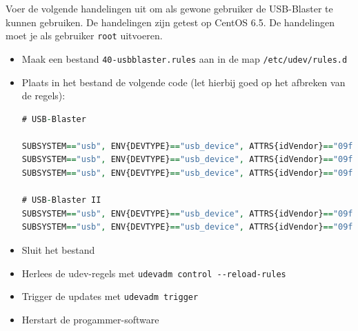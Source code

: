 \documentclass[a4paper,12pt,fleqn,twoside]{book}
\begin{document}
Voer de volgende handelingen uit om als gewone gebruiker de USB-Blaster te
kunnen gebruiken. De handelingen zijn getest op CentOS 6.5. De handelingen
moet je als gebruiker \lstinline|root| uitvoeren.

\begin{itemize}\itemsep-1pt
\item Maak een bestand \lstinline|40-usbblaster.rules| aan in de map
      \lstinline|/etc/udev/rules.d|
\item Plaats in het bestand de volgende code (let hierbij goed op het afbreken
      van de regels):
\begin{lstlisting}[language=VHDL,numbers=none,belowskip=-3.5ex]
# USB-Blaster

SUBSYSTEM=="usb", ENV{DEVTYPE}=="usb_device", ATTRS{idVendor}=="09fb", ATTRS{idProduct}=="6001", MODE="0666", SYMLINK+="usbblaster/%k"
SUBSYSTEM=="usb", ENV{DEVTYPE}=="usb_device", ATTRS{idVendor}=="09fb", ATTRS{idProduct}=="6002", MODE="0666", SYMLINK+="usbblaster/%k"
SUBSYSTEM=="usb", ENV{DEVTYPE}=="usb_device", ATTRS{idVendor}=="09fb", ATTRS{idProduct}=="6003", MODE="0666", SYMLINK+="usbblaster/%k"

# USB-Blaster II
SUBSYSTEM=="usb", ENV{DEVTYPE}=="usb_device", ATTRS{idVendor}=="09fb", ATTRS{idProduct}=="6010", MODE="0666", SYMLINK+="usbblaster2/%k"
SUBSYSTEM=="usb", ENV{DEVTYPE}=="usb_device", ATTRS{idVendor}=="09fb", ATTRS{idProduct}=="6810", MODE="0666", SYMLINK+="usbblaster2/%k"
\end{lstlisting}
\item Sluit het bestand
\item Herlees de udev-regels met \lstinline|udevadm control --reload-rules|
\item Trigger de updates met \lstinline|udevadm trigger|
\item Herstart de progammer-software
\end{itemize}


\end{document}
